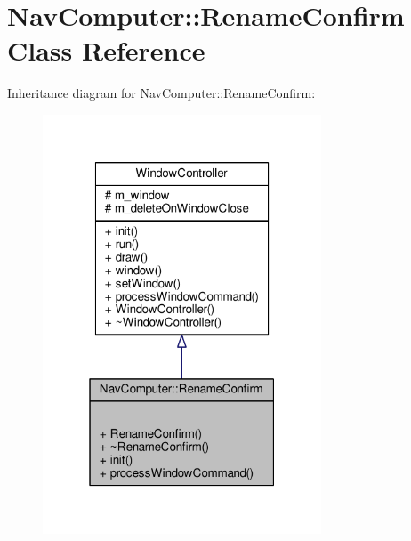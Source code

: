 \hypertarget{classNavComputer_1_1RenameConfirm}{}\section{Nav\+Computer\+:\+:Rename\+Confirm Class Reference}
\label{classNavComputer_1_1RenameConfirm}


Inheritance diagram for Nav\+Computer\+:\+:Rename\+Confirm\+:
\nopagebreak
\begin{figure}[H]
\begin{center}
\leavevmode
\includegraphics[width=235pt]{dd/db5/classNavComputer_1_1RenameConfirm__inherit__graph}
\end{center}
\end{figure}


